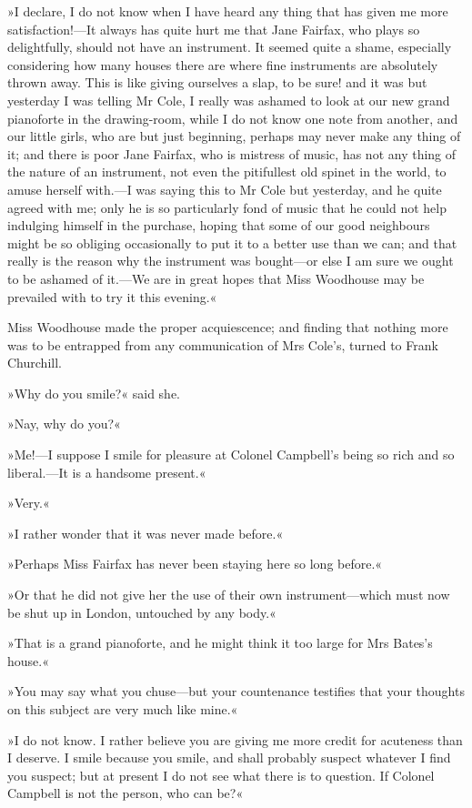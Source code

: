 »I declare, I do not know when I have heard any thing that has given me more satisfaction!—It always has quite hurt me that Jane Fairfax, who plays so delightfully, should not have an instrument. It seemed quite a shame, especially considering how many houses there are where fine instruments are absolutely thrown away. This is like giving ourselves a slap, to be sure! and it was but yesterday I was telling Mr Cole, I really was ashamed to look at our new grand pianoforte in the drawing-room, while I do not know one note from another, and our little girls, who are but just beginning, perhaps may never make any thing of it; and there is poor Jane Fairfax, who is mistress of music, has not any thing of the nature of an instrument, not even the pitifullest old spinet in the world, to amuse herself with.—I was saying this to Mr Cole but yesterday, and he quite agreed with me; only he is so particularly fond of music that he could not help indulging himself in the purchase, hoping that some of our good neighbours might be so obliging occasionally to put it to a better use than we can; and that really is the reason why the instrument was bought—or else I am sure we ought to be ashamed of it.—We are in great hopes that Miss Woodhouse may be prevailed with to try it this evening.«

Miss Woodhouse made the proper acquiescence; and finding that nothing more was to be entrapped from any communication of Mrs Cole's, turned to Frank Churchill.

»Why do you smile?« said she.

»Nay, why do you?«

»Me!—I suppose I smile for pleasure at Colonel Campbell's being so rich and so liberal.—It is a handsome present.«

»Very.«

»I rather wonder that it was never made before.«

»Perhaps Miss Fairfax has never been staying here so long before.«

»Or that he did not give her the use of their own instrument—which must now be shut up in London, untouched by any body.«

»That is a grand pianoforte, and he might think it too large for Mrs Bates's house.«

»You may say what you chuse—but your countenance testifies that your thoughts on this subject are very much like mine.«

»I do not know. I rather believe you are giving me more credit for acuteness than I deserve. I smile because you smile, and shall probably suspect whatever I find you suspect; but at present I do not see what there is to question. If Colonel Campbell is not the person, who can be?«

